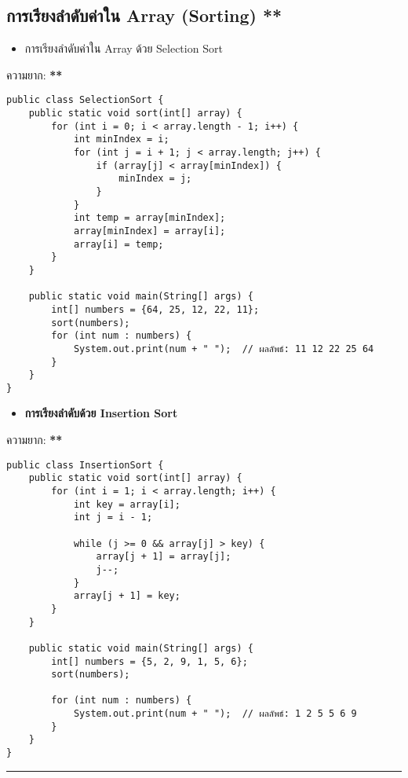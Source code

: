 \documentclass[11pt]{article}
\begin{document}
\subsection{การเรียงลำดับค่าใน Array (Sorting) \textbf{**}}
\label{sec:org8fe34b1}
\begin{itemize}
\item การเรียงลำดับค่าใน Array ด้วย Selection Sort
\end{itemize}
ความยาก: \textbf{**}
\begin{verbatim}
public class SelectionSort {
    public static void sort(int[] array) {
        for (int i = 0; i < array.length - 1; i++) {
            int minIndex = i;
            for (int j = i + 1; j < array.length; j++) {
                if (array[j] < array[minIndex]) {
                    minIndex = j;
                }
            }
            int temp = array[minIndex];
            array[minIndex] = array[i];
            array[i] = temp;
        }
    }

    public static void main(String[] args) {
        int[] numbers = {64, 25, 12, 22, 11};
        sort(numbers);
        for (int num : numbers) {
            System.out.print(num + " ");  // ผลลัพธ์: 11 12 22 25 64
        }
    }
}
\end{verbatim}
\begin{itemize}
\item \textbf{การเรียงลำดับด้วย Insertion Sort}
\end{itemize}
ความยาก: \textbf{**}
\begin{verbatim}
public class InsertionSort {
    public static void sort(int[] array) {
        for (int i = 1; i < array.length; i++) {
            int key = array[i];
            int j = i - 1;

            while (j >= 0 && array[j] > key) {
                array[j + 1] = array[j];
                j--;
            }
            array[j + 1] = key;
        }
    }

    public static void main(String[] args) {
        int[] numbers = {5, 2, 9, 1, 5, 6};
        sort(numbers);

        for (int num : numbers) {
            System.out.print(num + " ");  // ผลลัพธ์: 1 2 5 5 6 9
        }
    }
}
\end{verbatim}

\noindent\rule{\textwidth}{0.5pt}
\end{document}
